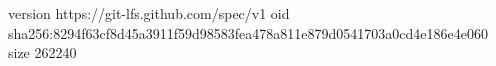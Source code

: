 version https://git-lfs.github.com/spec/v1
oid sha256:8294f63cf8d45a3911f59d98583fea478a811e879d0541703a0cd4e186e4e060
size 262240
